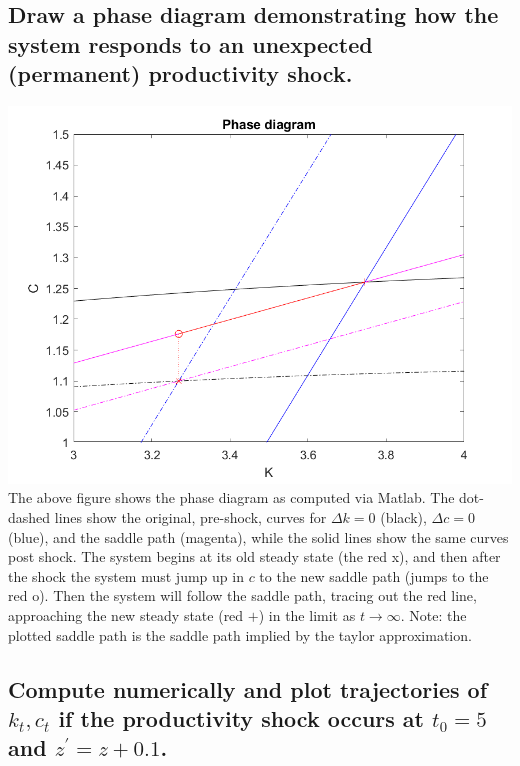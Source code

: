 \documentclass[11pt]{article} %
\begin{document}
\subsection{Draw a phase diagram demonstrating how the system responds to an unexpected (permanent) productivity shock.}
\includegraphics{phase}
The above figure shows the phase diagram as computed via Matlab. The dot-dashed lines show the original, pre-shock, curves for $\Delta k = 0$ (black), $\Delta c = 0$ (blue), and the saddle path (magenta), while the solid lines show the same curves post shock. The system begins at its old steady state (the red x), and then after the shock the system must jump up in $c$ to the new saddle path (jumps to the red o). Then the system will follow the saddle path, tracing out the red line, approaching the new steady state (red $+$) in the limit as $t \rightarrow \infty$. Note: the plotted saddle path is the saddle path implied by the taylor approximation.

\subsection{Compute numerically and plot trajectories of $k_t,c_t$ if the productivity shock occurs at $t_0 = 5$ and $z^{'} = z+0.1$.}
\end{document}
